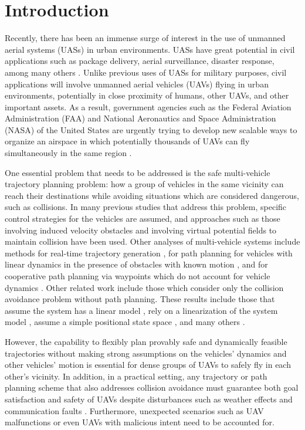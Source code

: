 \section{Introduction}
Recently, there has been an immense surge of interest in the use of unmanned aerial systems (UASs) in urban environments. 
UASs have great potential in civil applications such as package delivery, aerial surveillance, disaster response, among many others . %
Unlike previous uses of UASs for military purposes, civil applications will involve unmanned aerial vehicles (UAVs) flying in urban environments, potentially in close proximity of humans, other UAVs, and other important assets. 
As a result, government agencies such as the Federal Aviation Administration (FAA) and National Aeronautics and Space Administration (NASA) of the United States are urgently trying to develop new scalable ways to organize an airspace in which potentially thousands of UAVs can fly simultaneously in the same region \cite{FAA13, Kopardekar16}.

One essential problem that needs to be addressed is the safe multi-vehicle trajectory planning problem: how a group of vehicles in the same vicinity can reach their destinations while avoiding situations which are considered dangerous, such as collisions. In many previous studies that address this problem, specific control strategies for the vehicles are assumed, and approaches such as those involving induced velocity obstacles \cite{Fiorini98, Vandenberg08,Wu2012} and involving virtual potential fields to maintain collision \cite{Olfati-Saber2002, Chuang07} have been used. Other analyses of multi-vehicle systems include methods for real-time trajectory generation \cite{Feng-LiLian2002}, for path planning for vehicles with linear dynamics in the presence of obstacles with known motion \cite{Ahmadzadeh2009}, and for cooperative path planning via waypoints which do not account for vehicle dynamics \cite{Bellingham}. Other related work include those which consider only the collision avoidance problem without path planning. These results include those that assume the system has a linear model \cite{Beard2003, Schouwenaars2004, Stipanovic2007}, rely on a linearization of the system model \cite{Massink2001, Althoff2011}, assume a simple positional state space \cite{Lin2015}, and many others \cite{Lalish2008, Hoffmann2008, Chen2016}.

However, the capability to flexibly plan provably safe and dynamically feasible trajectories without making strong assumptions on the vehicles' dynamics and other vehicles' motion is essential for dense groups of UAVs to safely fly in each other's vicinity. In addition, in a practical setting, any trajectory or path planning scheme that also addresses collision avoidance must guarantee both goal satisfaction and safety of UAVs despite disturbances such as weather effects and communication faults \cite{Kopardekar16}. Furthermore, unexpected scenarios such as UAV malfunctions or even UAVs with malicious intent need to be accounted for.

